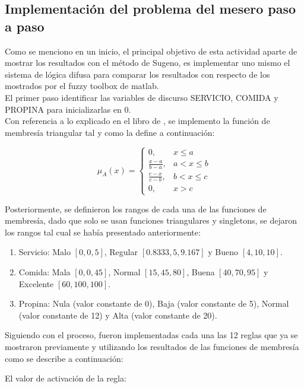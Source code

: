 \documentclass[11pt, letterpaper]{article}
\begin{document}
\newpage

\subsection{Implementación del problema del mesero paso a paso}

Como se menciono en un inicio, el principal objetivo de esta actividad aparte de mostrar los resultados con el método de Sugeno, es implementar uno mismo el sistema de lógica difusa para comparar los resultados con respecto de los mostrados por el fuzzy toolbox de matlab.\\

El primer paso  identificar las variables de discurso SERVICIO, COMIDA y PROPINA para inicializarlas en 0.\\

Con referencia a lo explicado en el libro de \cite{Cisneros2004}, se implemento la función de membresía triangular tal y como la define a continuación:

$$
\mu_A(x) = 
\begin{cases}
	0, & x \le a \\
	\frac{x - a}{b - a}, & a < x \le b \\
	\frac{c - x}{c - b}, & b < x \le c \\
	0, & x > c
\end{cases}
$$


Posteriormente, se definieron los rangos de cada una de las funciones de membresía, dado que solo se usan funciones triangulares y singletons, se dejaron los rangos tal cual se había presentado anteriormente:


\begin{enumerate}
	\item Servicio: Malo $[0,0,5]$, Regular $[0.8333,5,9.167]$ y Bueno $[4,10,10]$.	
	\item Comida: Mala $[0,0,45]$, Normal $[15,45,80]$, Buena $[40,70,95]$ y Excelente $[60,100,100]$.
	\item Propina: Nula (valor constante de 0), Baja (valor constante de 5), Normal (valor constante de 12) y Alta (valor constante de 20).
\end{enumerate}


Siguiendo con el proceso, fueron implementadas cada una las 12 reglas que ya se mostraron previamente y utilizando los resultados de las funciones de membresía como se describe a continuación:

El valor de activación de la regla:
\end{document}

